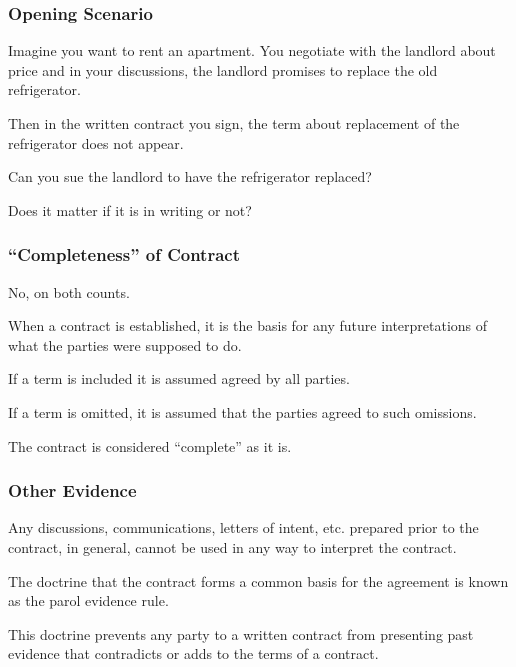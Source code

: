 \begin{frame}
\partpage
\end{frame}



\begin{frame}
\frametitle{Opening Scenario}

Imagine you want to rent an apartment. You negotiate with the landlord about price and in your discussions, the landlord promises to replace the old refrigerator.

Then in the written contract you sign, the term about replacement of the refrigerator does not appear.

Can you sue the landlord to have the refrigerator replaced?

Does it matter if it is in writing or not?

\end{frame}



\begin{frame}
\frametitle{``Completeness'' of Contract}

No, on both counts.

When a contract is established, it is the basis for any future interpretations of what the parties were supposed to do.

If a term is included it is assumed agreed by all parties.

If a term is omitted, it is assumed that the parties agreed to such omissions.

The contract is considered ``complete'' as it is.

\end{frame}



\begin{frame}
\frametitle{Other Evidence}

Any discussions, communications, letters of intent, etc. prepared prior to the contract, in general, cannot be used in any way to interpret the contract.

The doctrine that the contract forms a common basis for the agreement is known as the \alert{parol evidence rule}.

This doctrine prevents any party to a written contract from presenting past evidence that contradicts or adds to the terms of a contract.

\end{frame}



